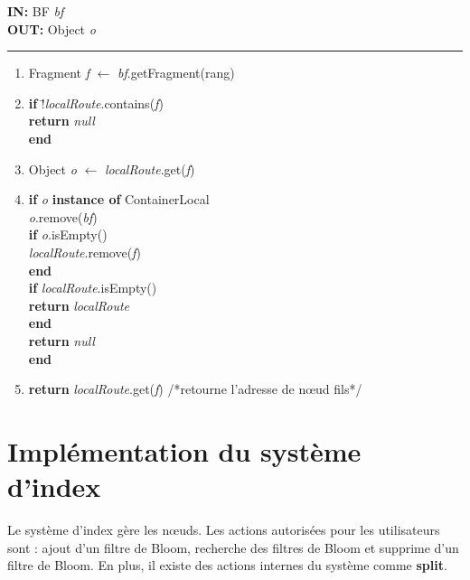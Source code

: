 \documentclass[a4paper,11pt]{report}
\begin{document}
\begin{flushleft}
	\begin{framed}
		\textbf{IN:} BF \textit{bf}\\
		\textbf{OUT:} Object \textit{o}\\
		\noindent\rule{\linewidth}{0.5pt}

		\begin{enumerate}
			\item Fragment \textit{f} $\leftarrow$ \textit{bf}.getFragment(rang)
			\item 
				\begin{tabbing}
					\textbf{if }\= !\textit{localRoute}.contains(\textit{f})\\
						\> \textbf{return} \textit{null}\\
					\textbf{end}
				\end{tabbing}
			\item Object \textit{o} $\leftarrow$ \textit{localRoute}.get(\textit{f})
			\item
				\begin{tabbing}
					\textbf{if }\= \textit{o} \textbf{instance of} ContainerLocal\\
						\> \textit{o}.remove(\textit{bf})\\
						\> \textbf{if }\= \textit{o}.isEmpty()\\
						\> \> \textit{localRoute}.remove(\textit{f})\\
						\> \textbf{end}\\
						\> \textbf{if }\= \textit{localRoute}.isEmpty()\\
						\> \> \textbf{return} \textit{localRoute}\\
						\> \textbf{end}\\
						\> \textbf{return} \textit{null}\\
					\textbf{end}
				\end{tabbing}
			\item \textbf{return} \textit{localRoute}.get(\textit{f}) /*retourne l'adresse de nœud fils*/
		\end{enumerate}	
	\end{framed}
\end{flushleft}

\section{Implémentation du système d'index}
	Le système d'index gère les nœuds. Les actions autorisées pour les utilisateurs sont : ajout d'un filtre de Bloom, recherche des filtres de Bloom et supprime d'un filtre de Bloom. En plus, il existe des actions internes du système comme \textbf{split}.
	
\end{document}
